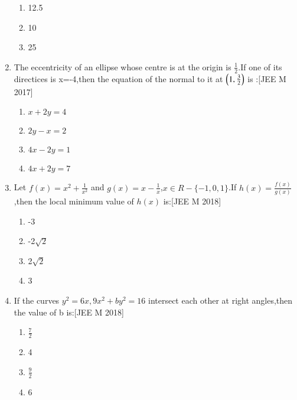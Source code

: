 \documentclass[journal,12pt,twocolumn]{IEEEtran}
\theoremstyle{remark}
\begin{document}
\begin{enumerate}
\begin{enumerate}
    \item  12.5\\
    \item  10\\
    \item  25\\
\end{enumerate}
\item The eccentricity of an ellipse whose centre is at the origin is $\frac{1}{2}$.If one of its directices is x=-4,then the equation of the normal to it at $\left(1,\frac{3}{2}\right)$ is :\hfill[JEE M 2017]\\
\begin{enumerate}
    \item  $x+2y=4$\\
    \item  $2y-x=2$\\
    \item  $4x-2y=1$\\
    \item  $4x+2y=7$\\
\end{enumerate}
\item Let $f(x)=x^{2}+\frac{1}{x^2}$ and $g(x)=x-\frac{1}{x}$,$x \in R-{\{-1,0,1}\}$.If $h(x)=\frac{f(x)}{g(x)}$,then the local minimum value of $h(x)$ is:\hfill[JEE M 2018]\\
\begin{enumerate}
    \item  -3\\
    \item  -2$\sqrt{2}$\\
    \item   2$\sqrt{2}$\\
    \item   3\\
\end{enumerate}
\item If the curves $y^2=6x,9x^2+by^2=16$ intersect each other at right angles,then the value of b is:\hfill[JEE M 2018]\\
\begin{enumerate}
    \item  $\frac{7}{2}$\\
    \item  4\\
    \item  $\frac{9}{2}$\\
    \item  6\\
\end{enumerate}
\end{enumerate}
\end{document}
